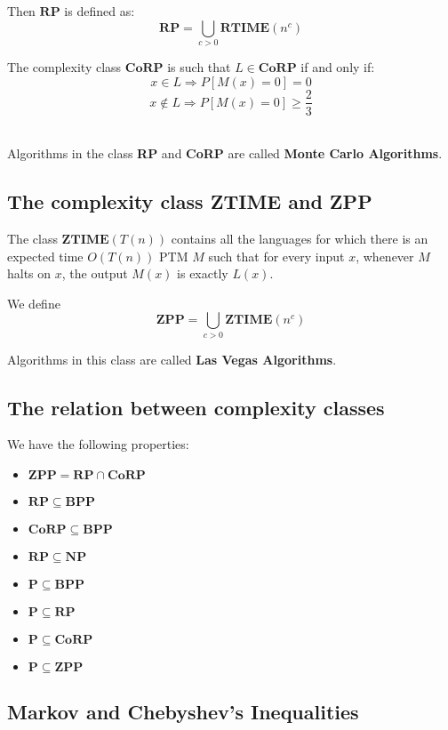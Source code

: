 \documentclass[12pt,letterpaper]{article}
\theoremstyle{definition}
\begin{document}
Then $\mathbf{RP}$ is defined as:
\[\mathbf{RP} = \bigcup_{c > 0} \mathbf{RTIME}(n^c)\]

The complexity class $\mathbf{CoRP}$ is such that $L \in \mathbf{CoRP}$ if and only if:
\[x \in L \Rightarrow P[M(x) = 0] = 0\]
\[x \notin L \Rightarrow P[M(x) = 0] \geq \frac{2}{3}\]\

Algorithms in the class \textbf{RP} and \textbf{CoRP}   are called \textbf{Monte Carlo Algorithms}.

\subsection{The complexity class ZTIME and ZPP}

The class $\mathbf{ZTIME}(T(n))$ contains all the languages for which there is an expected time $O(T(n))$ PTM $M$ such that for every input $x$, whenever $M$ halts on $x$, the output $M(x)$ is exactly $L(x)$.

We define 
\[\mathbf{ZPP} = \bigcup_{c > 0} \mathbf{ZTIME}(n^c)\]

Algorithms in this class are called \textbf{Las Vegas Algorithms}.

\subsection{The relation between complexity classes}

We have the following properties:

\begin{itemize}
  \item $\mathbf{ZPP} = \mathbf{RP} \cap \mathbf{CoRP}$
  \item $\mathbf{RP} \subseteq \mathbf{BPP}$
  \item $\mathbf{CoRP} \subseteq \mathbf{BPP}$
  \item $\mathbf{RP} \subseteq \mathbf{NP}$
  \item $\mathbf{P} \subseteq \mathbf{BPP}$
  \item $\mathbf{P} \subseteq \mathbf{RP}$
  \item $\mathbf{P} \subseteq \mathbf{CoRP}$
  \item $\mathbf{P} \subseteq \mathbf{ZPP}$
\end{itemize}

\subsection{Markov and Chebyshev's Inequalities}
\end{document}
